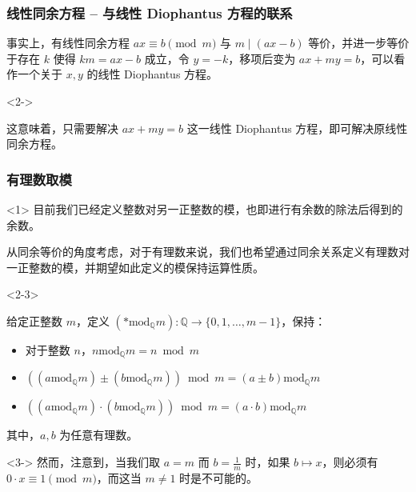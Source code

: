 \documentclass{../pkslide}
\begin{document}
\begin{frame}
  \frametitle{线性同余方程 -- 与线性 Diophantus 方程的联系}
  事实上，有线性同余方程 $a x \equiv b \pmod{m}$ 与 $m \mid (a x - b)$ 等价，并进一步等价于存在 $k$ 使得 $k m = a x - b$ 成立，令 $y = -k$，移项后变为 $a x + m y = b$，可以看作一个关于 $x, y$ 的线性 Diophantus 方程。
  
  \begin{uncoverenv}<2->
    \emptyline
    
    这意味着，只需要解决 $a x + m y = b$ 这一线性 Diophantus 方程，即可解决原线性同余方程。
  \end{uncoverenv}
\end{frame}

\begin{frame}
  \frametitle{有理数取模}
  \begin{onlyenv}<1>
    目前我们已经定义整数对另一正整数的模，也即进行有余数的除法后得到的余数。
    
    \emptyline
    
    从同余等价的角度考虑，对于有理数来说，我们也希望通过同余关系定义有理数对一正整数的模，并期望如此定义的模保持运算性质。
  \end{onlyenv}
  
  \begin{onlyenv}<2-3>
    \begin{definition}[有理数取模]
      给定正整数 $m$，定义 $({\ast} \mathbin{\mathrm{mod}_{\mathbb Q}} m) : \mathbb Q \to \{ 0, 1, \ldots, m - 1 \}$，保持：
      
      \begin{itemize}
        \item 对于整数 $n$，$n \mathbin{\mathrm{mod}_{\mathbb Q}} m = n \bmod m$
        \item $((a \mathbin{\mathrm{mod}_{\mathbb Q}} m) \pm (b \mathbin{\mathrm{mod}_{\mathbb Q}} m)) \bmod m = (a \pm b) \mathbin{\mathrm{mod}_{\mathbb Q}} m$
        \item $((a \mathbin{\mathrm{mod}_{\mathbb Q}} m) \cdot (b \mathbin{\mathrm{mod}_{\mathbb Q}} m)) \bmod m = (a \cdot b) \mathbin{\mathrm{mod}_{\mathbb Q}} m$
      \end{itemize}
      
      其中，$a, b$ 为任意有理数。
    \end{definition}
    
    \begin{uncoverenv}<3->
      然而，注意到，当我们取 $a = m$ 而 $b = \frac{1}{m}$ 时，如果 $b \mapsto x$，则必须有 $0 \cdot x \equiv 1 \pmod{m}$，而这当 $m \ne 1$ 时是不可能的。
    \end{uncoverenv}
  \end{onlyenv}
\end{frame}
\end{document}
